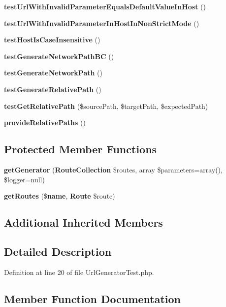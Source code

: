 \begin{DoxyCompactItemize}
\item 
{\bf test\+Url\+With\+Invalid\+Parameter\+Equals\+Default\+Value\+In\+Host} ()
\item 
{\bf test\+Url\+With\+Invalid\+Parameter\+In\+Host\+In\+Non\+Strict\+Mode} ()
\item 
{\bf test\+Host\+Is\+Case\+Insensitive} ()
\item 
{\bf test\+Generate\+Network\+Path\+B\+C} ()
\item 
{\bf test\+Generate\+Network\+Path} ()
\item 
{\bf test\+Generate\+Relative\+Path} ()
\item 
{\bf test\+Get\+Relative\+Path} (\$source\+Path, \$target\+Path, \$expected\+Path)
\item 
{\bf provide\+Relative\+Paths} ()
\end{DoxyCompactItemize}
\subsection*{Protected Member Functions}
\begin{DoxyCompactItemize}
\item 
{\bf get\+Generator} ({\bf Route\+Collection} \$routes, array \$parameters=array(), \$logger=null)
\item 
{\bf get\+Routes} (\${\bf name}, {\bf Route} \$route)
\end{DoxyCompactItemize}
\subsection*{Additional Inherited Members}


\subsection{Detailed Description}


Definition at line 20 of file Url\+Generator\+Test.\+php.



\subsection{Member Function Documentation}

